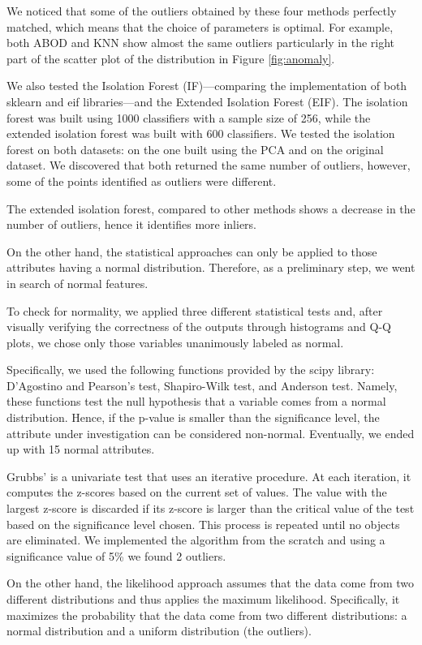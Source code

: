 \documentclass[10pt, a4paper, twocolumn]{article}
\begin{document}
We noticed that some of the outliers obtained by these four methods perfectly matched, which means that the choice of parameters is optimal. For example, both ABOD and KNN show almost the same outliers particularly in the right part of the scatter plot of the distribution in Figure \ref{fig:anomaly}.

We also tested the Isolation Forest (IF)---comparing the implementation of both sklearn and eif libraries---and the Extended Isolation Forest (EIF). The isolation forest was built using 1000 classifiers with a sample size of 256, while the extended isolation forest was built with 600 classifiers. We tested the isolation forest on both datasets: on the one built using the PCA and on the original dataset. We discovered that both returned the same number of outliers, however, some of the points identified as outliers were different.  

The extended isolation forest, compared to other methods shows a decrease in the number of outliers, hence it identifies more inliers.

On the other hand, the statistical approaches can only be applied to those attributes having a normal distribution. Therefore, as a preliminary step, we went in search of normal features. 

To check for normality, we applied three different statistical tests and, after visually verifying the correctness of the outputs through histograms and Q-Q plots, we chose only those variables unanimously labeled as normal.

Specifically, we used the following functions provided by the scipy library: D’Agostino and Pearson’s test, Shapiro-Wilk test, and Anderson test. Namely, these functions test the null hypothesis that a variable comes from a normal distribution. Hence, if the p-value is smaller than the significance level, the attribute under investigation can be considered non-normal. Eventually, we ended up with 15 normal attributes. 

Grubbs' is a univariate test that uses an iterative procedure. At each iteration, it computes the z-scores based on the current set of values. The value with the largest z-score is discarded if its z-score is larger than the critical value of the test based on the significance level chosen. This process is repeated until no objects are eliminated. We implemented the algorithm from the scratch and using a significance value of 5\% we found 2 outliers.

On the other hand, the likelihood approach assumes that the data come from two different distributions and thus applies the maximum likelihood. Specifically, it maximizes the probability that the data come from two different distributions: a normal distribution and a uniform distribution (the outliers).
\end{document}
